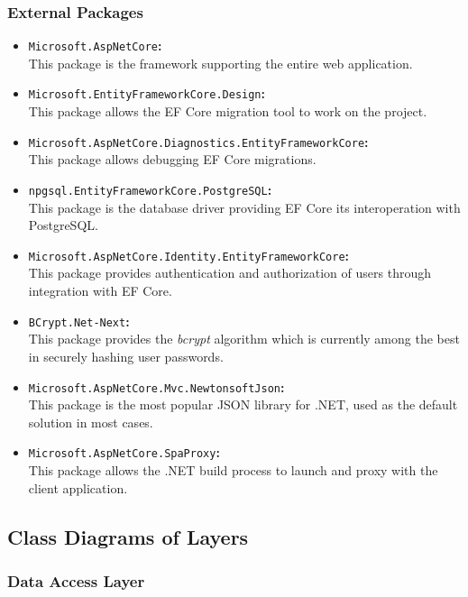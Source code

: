 \documentclass[a4paper, 12pt, titlepage]{article}
\begin{document}
  \subsubsection{External Packages}

  \begin{itemize}
    \item \texttt{Microsoft.AspNetCore}\textbf{:}\\
      This package is the framework supporting the entire web application.
    \item \texttt{Microsoft.EntityFrameworkCore.Design}\textbf{:}\\
      This package allows the EF Core migration tool to work on the project.
    \item \texttt{Microsoft.AspNetCore.Diagnostics.EntityFrameworkCore}\textbf{:}\\
      This package allows debugging EF Core migrations.
    \item \texttt{npgsql.EntityFrameworkCore.PostgreSQL}\textbf{:}\\
      This package is the database driver providing EF Core its interoperation with PostgreSQL.
    \item \texttt{Microsoft.AspNetCore.Identity.EntityFrameworkCore}\textbf{:}\\
      This package provides authentication and authorization of users through integration with EF Core.
    \item \texttt{BCrypt.Net-Next}\textbf{:}\\
      This package provides the \textit{bcrypt} algorithm which is currently among the best in securely hashing user passwords.
    \item \texttt{Microsoft.AspNetCore.Mvc.NewtonsoftJson}\textbf{:}\\
      This package is the most popular JSON library for .NET, used as the default solution in most cases.
    \item \texttt{Microsoft.AspNetCore.SpaProxy}\textbf{:}\\
      This package allows the .NET build process to launch and proxy with the client application.
  \end{itemize}

  \subsection{Class Diagrams of Layers}

  \subsubsection{Data Access Layer}
\end{document}
